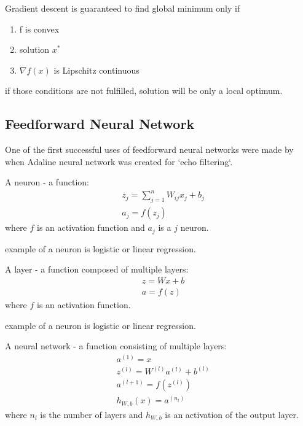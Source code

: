 \begin{theorem} Gradient descent is guaranteed to find global minimum only if
	\begin{enumerate}
		\item f is convex
		\item solution $x^{*}$
		\item $\nabla f(x)$ is Lipschitz continuous
	\end{enumerate}
\end{theorem}
if those conditions are not fulfilled, solution will be only a local optimum.


\subsection{Feedforward Neural Network}

One of the first successful uses of feedforward neural networks were made by \textcite{widrow} when Adaline neural network was created for `echo filtering`. 

\begin{definition} A neuron - a function:
\begin{align}
	& z_j=\sum\limits^n_{j=1} W_{ij}x_j+b_j \\
& a_j=f(z_j) 
\end{align}
where $f$ is an activation function and $a_j$ is a $j$ neuron.
\end{definition}
example of a neuron is logistic or linear regression.

\begin{definition} A layer - a function composed of multiple layers:
\begin{align}
& z = Wx+b \\
& a=f(z) 
\end{align}
where $f$ is an activation function.
\end{definition}
example of a neuron is logistic or linear regression.


\begin{definition} A neural network - a function consisting of multiple layers:
\begin{align}
	& a^{(1)}=x \\
	& z^{(l)}=W^{(l)}a^{(l)}+b^{(l)} \\
	& a^{(l+1)}=f(z^{(l)}) \\
	& h_{W,b}(x)=a^{(n_l)}
\end{align}
where $n_l$ is the number of layers and $h_{W,b}$ is an activation of the output layer. 
\end{definition}


